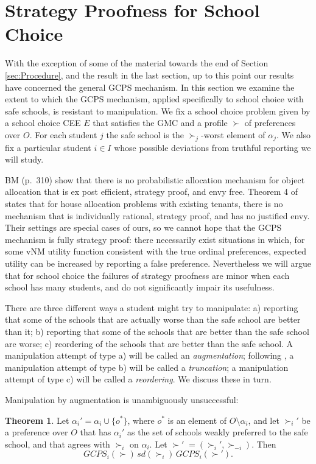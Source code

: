\documentclass[12pt]{article}
\theoremstyle{definition}
\newtheorem{thm}{Theorem}
\begin{document}
\section{Strategy Proofness for School Choice} \label{sec:StrategyProof}

With the exception of some of the material towards the end of Section \ref{sec:Procedure}, and the result in the last section, up to this point our results have concerned the general GCPS mechanism.  In this section we examine the extent to which the GCPS mechanism, applied specifically to school choice with safe schools, is resistant to manipulation.  We fix a school choice problem given by a school choice CEE $E$ that satisfies the GMC and a profile $\succ$ of preferences over $O$.   For each student $j$ the safe school is the $\succ_j$-worst element of $\alpha_j$.  We also fix a particular student $i \in I$ whose possible deviations from truthful reporting we will study.

BM (p.~310) show that there is no probabilistic allocation mechanism for object allocation that is ex post efficient, strategy proof, and envy free.  Theorem 4 of \citet{yilmaz10geb} states that for house allocation problems with existing tenants, there is no mechanism that is individually rational, strategy proof, and has no justified envy.
Their settings are special cases of ours, so we cannot hope that the GCPS mechanism is fully strategy proof: there necessarily exist situations in which, for some vNM utility function consistent with the true ordinal preferences, expected utility can be increased by reporting a false preference. Nevertheless we will argue that for school choice the failures of strategy proofness are minor when each school has many students, and do not significantly impair its usefulness.

There are three different ways a student might try to manipulate: a) reporting that some of the schools that are actually worse than the safe school are better than it;  b) reporting that some of the schools that are better than the safe school are worse; c) reordering of the schools that are better than the safe school.
A manipulation attempt of type a) will be called an \emph{augmentation}; following \cite{RoRo99ecma}, a manipulation attempt of type b) will be called a \emph{truncation}; a  manipulation attempt of type c) will be called a \emph{reordering}.  We discuss these in turn. 

Manipulation by augmentation is unambiguously unsuccessful:

\begin{thm} \label{th:Augmentation}
  Let $\alpha_i' = \alpha_i \cup \{o^*\}$, where $o^*$ is an element of $O \setminus \alpha_i$, and let $\succ_i'$ be a preference over $O$ that has $\alpha_i'$ as the set of schools weakly preferred to the safe school, and that  agrees with $\succ_i$ on $\alpha_i$.  Let $\succ' \; = (\succ_i',\succ_{-i})$.  Then 
$$GCPS_i(\succ) \, sd(\succ_i) \, GCPS_i(\succ').$$
\end{thm}
\end{document}
